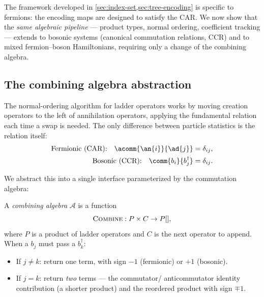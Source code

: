 %

The framework developed in \cref{sec:index-set,sec:tree-encoding} is
specific to fermions: the encoding maps are designed to satisfy the
CAR.  We now show that the \emph{same algebraic pipeline} — product
types, normal ordering, coefficient tracking — extends to bosonic
systems (canonical commutation relations, CCR) and to mixed
fermion--boson Hamiltonians, requiring only a change of the combining
algebra.

\subsection{The combining algebra abstraction}
\label{sec:ext-algebra}

The normal-ordering algorithm for ladder operators works by moving
creation operators to the left of annihilation operators, applying
the fundamental relation each time a swap is needed.  The only
difference between particle statistics is the relation itself:
\begin{align}
  \text{Fermionic (CAR):}\quad
  \acomm{\an{i}}{\ad{j}} &= \delta_{ij},
  \label{eq:car-combine} \\
  \text{Bosonic (CCR):}\quad
  \comm{b_i}{b_j^\dagger} &= \delta_{ij}.
  \label{eq:ccr-combine}
\end{align}

We abstract this into a single interface parameterized by the
commutation algebra:
\begin{definition}
\label{def:combining}
A \emph{combining algebra} $\mathcal{A}$ is a function
\begin{equation}
  \textsc{Combine}: P \times C \to P[],
\end{equation}
where $P$ is a product of ladder operators and $C$ is the next
operator to append.  When a $b_j$ must pass a $b_k^\dagger$:
\begin{itemize}
  \item If $j \neq k$: return one term, with sign $-1$ (fermionic)
    or $+1$ (bosonic).
  \item If $j = k$: return \emph{two} terms — the commutator/
    anticommutator identity contribution (a shorter product) and the
    reordered product with sign $\mp 1$.
\end{itemize}
\end{definition}

